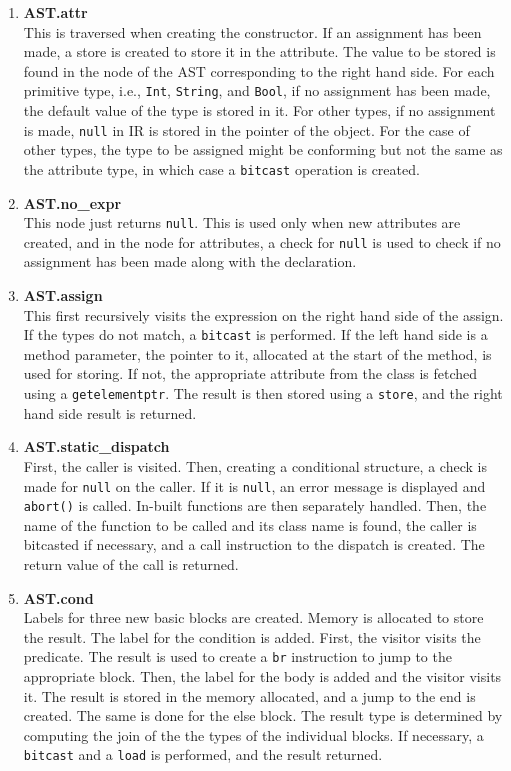 \documentclass{article}
\begin{document}
\begin{enumerate}
	\item \textbf{AST.attr} \\
	This is traversed when creating the constructor. If an assignment has been made, a store is created to store it in the attribute. The value to be stored is found in the node of the AST corresponding to the right hand side. For each primitive type, i.e., \verb|Int|, \verb|String|, and \verb|Bool|, if no assignment has been made, the default value of the type is stored in it. For other types, if no assignment is made, \verb|null| in IR is stored in the pointer of the object. For the case of other types, the type to be assigned might be conforming but not the same as the attribute type, in which case a \verb|bitcast| operation is created.
	\item \textbf{AST.no\_expr} \\
	This node just returns \verb|null|. This is used only when new attributes are created, and in the node for attributes, a check for \verb|null| is used to check if no assignment has been made along with the declaration.
	\item \textbf{AST.assign} \\
	This first recursively visits the expression on the right hand side of the assign. If the types do not match, a \verb|bitcast| is performed. If the left hand side is a method parameter, the pointer to it, allocated at the start of the method, is used for storing. If not, the appropriate attribute from the class is fetched using a \verb|getelementptr|. The result is then stored using a \verb|store|, and the right hand side result is returned.
	\item \textbf{AST.static\_dispatch} \\
	First, the caller is visited. Then, creating a conditional structure, a check is made for \verb|null| on the caller. If it is \verb|null|, an error message is displayed and \verb|abort()| is called. In-built functions are then separately handled. Then, the name of the function to be called and its class name is found, the caller is bitcasted if necessary, and a call instruction to the dispatch is created. The return value of the call is returned.
	\item \textbf{AST.cond} \\
	Labels for three new basic blocks are created. Memory is allocated to store the result. The label for the condition is added. First, the visitor visits the predicate. The result is used to create a \verb|br| instruction to jump to the appropriate block. Then, the label for the body is added and the visitor visits it. The result is stored in the memory allocated, and a jump to the end is created. The same is done for the else block. The result type is determined by computing the join of the the types of the individual blocks. If necessary, a \verb|bitcast| and a \verb|load| is performed, and the result returned.

\end{enumerate}
\end{document}
